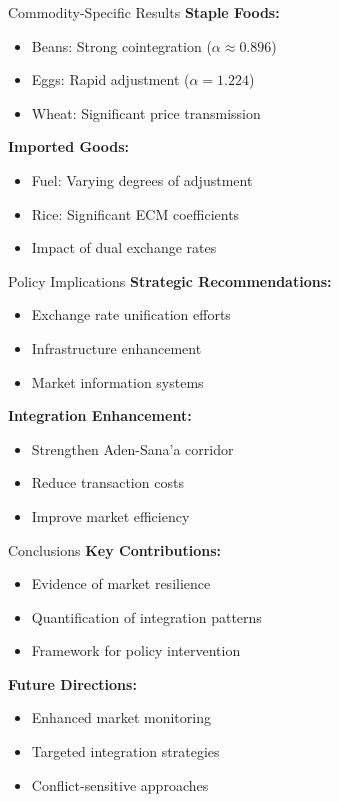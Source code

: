 \documentclass{beamer}
\begin{document}
\begin{frame}{Commodity-Specific Results}
    \textbf{Staple Foods:}
    \begin{itemize}
        \item Beans: Strong cointegration ($\alpha \approx 0.896$)
        \item Eggs: Rapid adjustment ($\alpha = 1.224$)
        \item Wheat: Significant price transmission
    \end{itemize}
    
    \textbf{Imported Goods:}
    \begin{itemize}
        \item Fuel: Varying degrees of adjustment
        \item Rice: Significant ECM coefficients
        \item Impact of dual exchange rates
    \end{itemize}
\end{frame}

\begin{frame}{Policy Implications}
    \textbf{Strategic Recommendations:}
    \begin{itemize}
        \item Exchange rate unification efforts
        \item Infrastructure enhancement
        \item Market information systems
    \end{itemize}
    
    \textbf{Integration Enhancement:}
    \begin{itemize}
        \item Strengthen Aden-Sana'a corridor
        \item Reduce transaction costs
        \item Improve market efficiency
    \end{itemize}
\end{frame}

\begin{frame}{Conclusions}
    \textbf{Key Contributions:}
    \begin{itemize}
        \item Evidence of market resilience
        \item Quantification of integration patterns
        \item Framework for policy intervention
    \end{itemize}
    
    \textbf{Future Directions:}
    \begin{itemize}
        \item Enhanced market monitoring
        \item Targeted integration strategies
        \item Conflict-sensitive approaches
    \end{itemize}
\end{frame}
\end{document}
